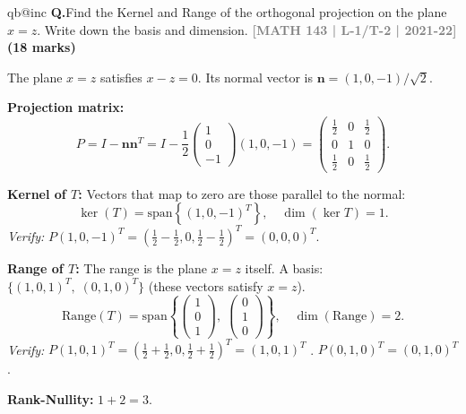 \documentclass[12pt,a3paper]{article}
\makeatletter
\newcommand{\yr}[1]{\hfill\textcolor{gray}{\small\textbf{[#1]}}}
\newcommand{\mk}[1]{\textcolor{orange!70!black}{\small\textbf{(#1 marks)}}}
\newcounter{qnum}
\newcommand{\Q}[1]{%
  \csname qb@inc\endcsname
  \needspace{4\baselineskip}
  \refstepcounter{qnum}
  \vspace{6pt}
  \noindent\textbf{Q\theqnum.}\enspace #1\par
}
\makeatother
\begin{document}
\Q{Find the Kernel and Range of the orthogonal projection on the plane $x = z$. Write down the basis and dimension.
\yr{MATH 143 | L-1/T-2 | 2021-22} \mk{18}}


\begin{tcolorbox}[enhanced,breakable,
  colback=cF!4,colframe=cF,boxrule=0.8pt,arc=5pt,
  title={\textbf{Answer --- Kernel \& Range of Projection onto Plane $x=z$ in $\mathbb{R}^3$}},
  fonttitle=\bfseries\color{white},colbacktitle=cF]

The plane $x=z$ satisfies $x-z=0$. Its normal vector is $\mathbf{n}=(1,0,-1)/\sqrt{2}$.

\textbf{Projection matrix:}
\[
P=I-\mathbf{n}\mathbf{n}^T=I-\frac{1}{2}\begin{pmatrix}1\\0\\-1\end{pmatrix}(1,0,-1)
=\begin{pmatrix}\frac{1}{2}&0&\frac{1}{2}\\0&1&0\\\frac{1}{2}&0&\frac{1}{2}\end{pmatrix}.
\]

\textbf{Kernel of $T$:} Vectors that map to zero are those parallel to the normal:
\[
\ker(T)=\mathrm{span}\!\left\{(1,0,-1)^T\right\},\quad\dim(\ker T)=1.
\]
\textit{Verify:} $P(1,0,-1)^T=(\tfrac{1}{2}-\tfrac{1}{2},0,\tfrac{1}{2}-\tfrac{1}{2})^T=(0,0,0)^T$. \checkmark

\textbf{Range of $T$:} The range is the plane $x=z$ itself.
A basis: $\{(1,0,1)^T,\;(0,1,0)^T\}$ (these vectors satisfy $x=z$).
\[
\mathrm{Range}(T)=\mathrm{span}\!\left\{\begin{pmatrix}1\\0\\1\end{pmatrix},\;\begin{pmatrix}0\\1\\0\end{pmatrix}\right\},\quad\dim(\mathrm{Range})=2.
\]
\textit{Verify:} $P(1,0,1)^T=(\tfrac{1}{2}+\tfrac{1}{2},0,\tfrac{1}{2}+\tfrac{1}{2})^T=(1,0,1)^T$ \checkmark.
$P(0,1,0)^T=(0,1,0)^T$ \checkmark.

\textbf{Rank-Nullity:} $1+2=3$. \checkmark

\end{tcolorbox}
\end{document}
